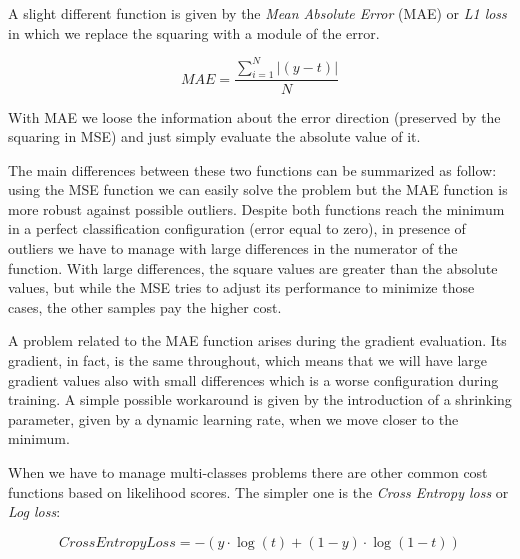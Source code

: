 \documentclass{standalone}
\begin{document}
A slight different function is given by the \emph{Mean Absolute Error} (MAE) or \emph{L1 loss} in which we replace the squaring with a module of the error.

\begin{equation}
MAE = \frac{\sum_{i=1}^{N}|\left( y - t \right)|}{N}
\end{equation}

With MAE we loose the information about the error direction (preserved by the squaring in MSE) and just simply evaluate the absolute value of it.

The main differences between these two functions can be summarized as follow: using the MSE function we can easily solve the problem but the MAE function is more robust against possible outliers.
Despite both functions reach the minimum in a perfect classification configuration (error equal to zero), in presence of outliers we have to manage with large differences in the numerator of the function.
With large differences, the square values are greater than the absolute values, but while the MSE tries to adjust its performance to minimize those cases, the other samples pay the higher cost.

A problem related to the MAE function arises during the gradient evaluation.
Its gradient, in fact, is the same throughout, which means that we will have large gradient values also with small differences which is a worse configuration during training.
A simple possible workaround is given by the introduction of a shrinking parameter, given by a dynamic learning rate, when we move closer to the minimum.

When we have to manage multi-classes problems there are other common cost functions based on likelihood scores.
The simpler one is the \emph{Cross Entropy loss} or \emph{Log loss}:

\begin{equation}
CrossEntropyLoss = -(y\cdot\log(t) + (1 - y)\cdot\log(1 - t))
\end{equation}
\end{document}
